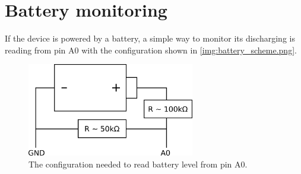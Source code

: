\section{Battery monitoring}
If the device is powered by a battery, a simple way to monitor its discharging is reading from pin A0 with the configuration shown in \autoref{img:battery_scheme.png}.

\begin{figure}[!htb] 
  \centering
  \includegraphics[width=0.65\textwidth]{latex/img/battery_scheme.png}
  \caption{The configuration needed to read battery level from pin A0.}\label{img:loadcells_scheme}
\end{figure}


